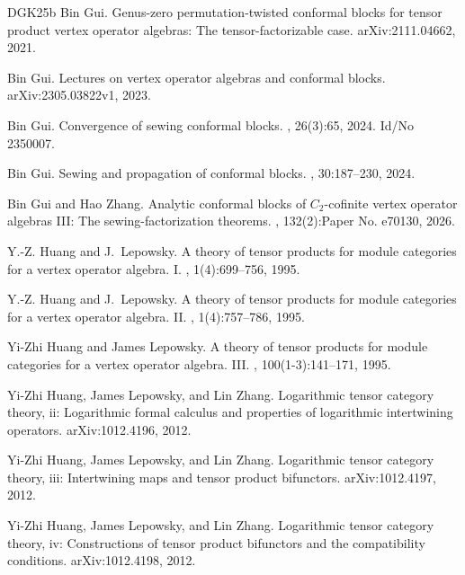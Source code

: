 \documentclass[11pt,b5paper,notitlepage]{article}
\theoremstyle{definition}
\theoremstyle{plain}
\newcommand{\<}{\left\langle}
\renewcommand{\>}{\right\rangle}
\numberwithin{equation}{section}
\begin{document}
\begin{thebibliography}{DGK25b}
Bin Gui.
\newblock Genus-zero permutation-twisted conformal blocks for tensor product
  vertex operator algebras: The tensor-factorizable case.
\newblock arXiv:2111.04662, 2021.

Bin Gui.
\newblock Lectures on vertex operator algebras and conformal blocks.
\newblock arXiv:2305.03822v1, 2023.

Bin Gui.
\newblock Convergence of sewing conformal blocks.
, 26(3):65, 2024.
\newblock Id/No 2350007.

Bin Gui.
\newblock Sewing and propagation of conformal blocks.
, 30:187--230, 2024.

Bin Gui and Hao Zhang.
\newblock Analytic conformal blocks of {$C_2$}-cofinite vertex operator
  algebras {III}: The sewing-factorization theorems.
, 132(2):Paper No. e70130, 2026.

Y.-Z. Huang and J.~Lepowsky.
\newblock A theory of tensor products for module categories for a vertex
  operator algebra. {I}.
, 1(4):699--756, 1995.

Y.-Z. Huang and J.~Lepowsky.
\newblock A theory of tensor products for module categories for a vertex
  operator algebra. {II}.
, 1(4):757--786, 1995.

Yi-Zhi Huang and James Lepowsky.
\newblock A theory of tensor products for module categories for a vertex
  operator algebra. {III}.
, 100(1-3):141--171, 1995.

Yi-Zhi Huang, James Lepowsky, and Lin Zhang.
\newblock Logarithmic tensor category theory, ii: Logarithmic formal calculus
  and properties of logarithmic intertwining operators.
\newblock arXiv:1012.4196, 2012.

Yi-Zhi Huang, James Lepowsky, and Lin Zhang.
\newblock Logarithmic tensor category theory, iii: Intertwining maps and tensor
  product bifunctors.
\newblock arXiv:1012.4197, 2012.

Yi-Zhi Huang, James Lepowsky, and Lin Zhang.
\newblock Logarithmic tensor category theory, iv: Constructions of tensor
  product bifunctors and the compatibility conditions.
\newblock arXiv:1012.4198, 2012.


\end{thebibliography}
\end{document}
